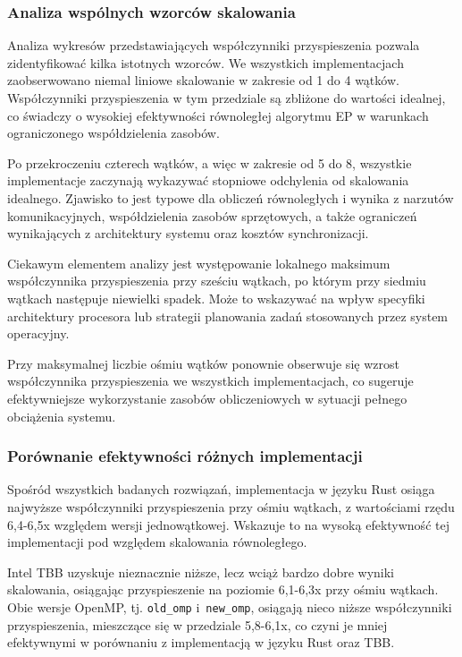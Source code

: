 \subsubsection{Analiza wspólnych wzorców skalowania}
Analiza wykresów przedstawiających współczynniki przyspieszenia pozwala zidentyfikować kilka istotnych wzorców. We wszystkich implementacjach zaobserwowano niemal liniowe skalowanie w zakresie od 1 do 4 wątków. Współczynniki przyspieszenia w tym przedziale są zbliżone do wartości idealnej, co świadczy o wysokiej efektywności równoległej algorytmu EP w warunkach ograniczonego współdzielenia zasobów.

Po przekroczeniu czterech wątków, a więc w zakresie od 5 do 8, wszystkie implementacje zaczynają wykazywać stopniowe odchylenia od skalowania idealnego. Zjawisko to jest typowe dla obliczeń równoległych i wynika z narzutów komunikacyjnych, współdzielenia zasobów sprzętowych, a także ograniczeń wynikających z architektury systemu oraz kosztów synchronizacji.

Ciekawym elementem analizy jest występowanie lokalnego maksimum współczynnika przyspieszenia przy sześciu wątkach, po którym przy siedmiu wątkach następuje niewielki spadek. Może to wskazywać na wpływ specyfiki architektury procesora lub strategii planowania zadań stosowanych przez system operacyjny.

Przy maksymalnej liczbie ośmiu wątków ponownie obserwuje się wzrost współczynnika przyspieszenia we wszystkich implementacjach, co sugeruje efektywniejsze wykorzystanie zasobów obliczeniowych w sytuacji pełnego obciążenia systemu.

\subsubsection{Porównanie efektywności różnych implementacji}
Spośród wszystkich badanych rozwiązań, implementacja w języku Rust osiąga najwyższe współczynniki przyspieszenia przy ośmiu wątkach, z wartościami rzędu 6,4-6,5x względem wersji jednowątkowej. Wskazuje to na wysoką efektywność tej implementacji pod względem skalowania równoległego.

Intel TBB uzyskuje nieznacznie niższe, lecz wciąż bardzo dobre wyniki skalowania, osiągając przyspieszenie na poziomie 6,1-6,3x przy ośmiu wątkach. Obie wersje OpenMP, tj. \texttt{old\_omp} i~\texttt{new\_omp}, osiągają nieco niższe współczynniki przyspieszenia, mieszczące się w przedziale 5,8-6,1x, co czyni je mniej efektywnymi w porównaniu z implementacją w języku Rust oraz TBB.


